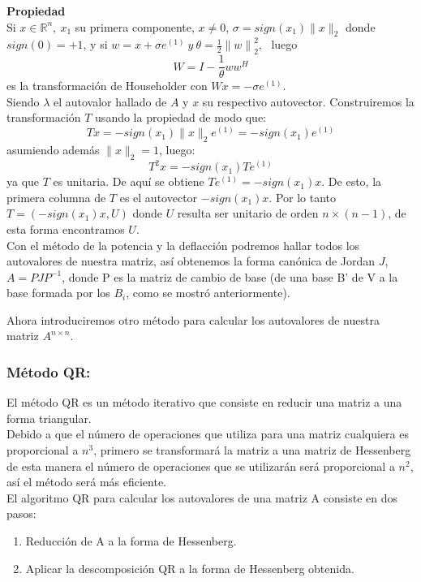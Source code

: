 \documentclass[12pt,a4paper]{article}
\begin{document}
\begin{multicols}{2}
\noindent\textbf{Propiedad}\\
\noindent Si $x \in\mathbb{R}^n, \ x_{1}$ su primera componente, $x\neq0$, $ \sigma=sign(x_{1})\|x\|_{2}$ donde $sign(0)=+1$, y si $w=x+\sigma e^{(1)} \ y \ \theta=\frac{1}{2}{\|w\|}^{2}_{2}$, \ luego $$W=I-\frac{1}{\theta}ww^{H}$$ es la transformación de Householder con $Wx=-\sigma e^{(1)}$.\\
Siendo $\lambda$ el autovalor hallado de $A$ y $x$ su respectivo autovector. Construiremos la transformación $T$ usando la propiedad de modo que:  $$Tx=-sign(x_{1})\|x\|_{2}e^{(1)}=-sign(x_{1})e^{(1)}$$ asumiendo además $\|x\|_{2}=1$, luego:\\
$$T^{2}x=-sign(x_{1})Te^{(1)}$$ya que $T$ es unitaria. De aquí se obtiene $Te^{(1)}=-sign(x_{1})x$. De esto, la primera columna de $T$ es el autovector $-sign(x_{1})x$. Por lo tanto $T=(-sign(x_{1})x,U)$ donde $U$ resulta ser unitario de orden $n\times(n-1)$, de esta forma encontramos $U$. \\

\noindent Con el método de la potencia y la deflacción podremos hallar todos los autovalores de nuestra matriz, así obtenemos la forma canónica de Jordan $J$, $A=PJP^{-1}$, donde P es la matriz de cambio de base (de una base B' de V a la base formada por los $B_{i}$, como se mostró anteriormente).

\noindent Ahora introduciremos otro método para calcular los autovalores de nuestra matriz $A^{n\times n}$.
\subsubsection{Método QR:}
\noindent El método QR es un método iterativo que consiste en reducir una matriz a una forma triangular.\\ Debido a que el número de operaciones que utiliza para una matriz cualquiera es proporcional a $n^3$, primero se transformará la matriz a una matriz de Hessenberg de esta manera el número de operaciones que se utilizarán será proporcional a $n^2$, así el método será más eficiente.\\

\noindent El algoritmo QR para calcular los autovalores de una matriz A consiste en dos pasos:\\
\begin{enumerate}
	\item Reducción de A a la forma de Hessenberg.
	\item Aplicar la descomposición QR a la forma de Hessenberg obtenida.
\end{enumerate}


\end{multicols}
\end{document}
